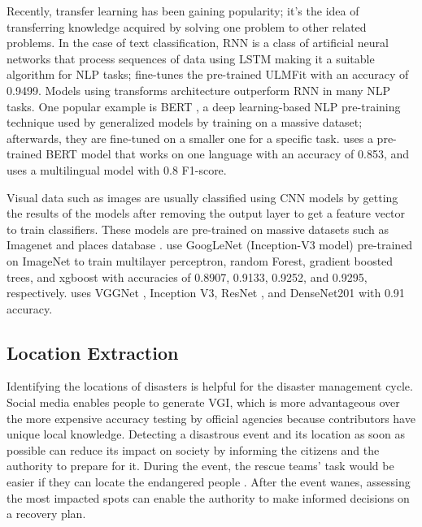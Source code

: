 Recently, transfer learning has been gaining popularity; it's the idea of transferring knowledge
acquired by solving one problem to other related problems. In the case of text classification,
\ac{RNN} is a class of artificial neural networks that process sequences of data using \ac{LSTM}
making it a suitable algorithm for \ac{NLP} tasks;
 fine-tunes the pre-trained \ac{ULMFit}
\cite{howardUniversalLanguageModel2018} with an accuracy of 0.9499. Models using transforms
architecture outperform \ac{RNN} in many \ac{NLP} tasks. One popular example is \ac{BERT}
\cite{devlinBERTPretrainingDeep2019}, a deep learning-based \ac{NLP} pre-training technique used by
generalized models by training on a massive dataset; afterwards, they are fine-tuned on a smaller
one for a specific task.  uses a pre-trained \ac{BERT} model
that works on one language with an accuracy of 0.853, and
 uses a multilingual model with 0.8 F1-score.

Visual data such as images are usually classified using \ac{CNN} models by getting the results of
the models after removing the output layer to get a feature vector to train classifiers. These
models are pre-trained on massive datasets such as Imagenet
\cite{krizhevskyImageNetClassificationDeep2017} and places database
\cite{zhouLearningDeepFeatures2014}.  use GoogLeNet
(Inception-V3 model) \cite{7780677} pre-trained on ImageNet to train multilayer perceptron, random
Forest, gradient boosted trees, and  xgboost with accuracies of 0.8907, 0.9133, 0.9252, and 0.9295,
respectively.  uses VGGNet
\cite{simonyanVeryDeepConvolutional2015}, Inception V3, ResNet \cite{heDeepResidualLearning2015},
and DenseNet201 \cite{huangDenselyConnectedConvolutional2018} with 0.91 accuracy.

\subsection{Location Extraction}
Identifying the locations of disasters is helpful for the disaster management cycle. Social media
enables people to generate \ac{VGI}, which is more advantageous over the more expensive accuracy
testing by official agencies because contributors have unique local knowledge.  Detecting a
disastrous event and its location as soon as possible can reduce its impact on society
\cite{debruijnGlobalDatabaseHistoric2019b} by informing the citizens and the authority to prepare
for it. During the event, the rescue teams' task would be easier if they can locate the endangered
people \cite{singhEventClassificationLocation2019}. After the event wanes, assessing the most
impacted spots can enable the authority to make informed decisions on a recovery plan.

